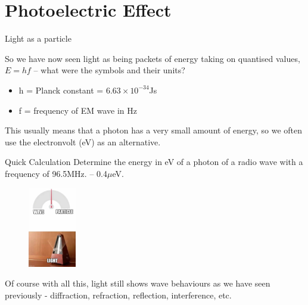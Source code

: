 \documentclass[../Main.tex]{subfiles}
\begin{document}
\author{Photoelectric Effect} %
\date{Year 1 Topic 20} %

\section{Photoelectric Effect} %

\begin{frame}{Light as a particle}
\begin{multicols}{2}
\begin{minipage}{7cm}
   So we have now seen light as being packets of energy taking on quantised values, $E=hf$ -- what were the symbols and their units?
   \pause
   \begin{itemize}
       \item h = Planck constant = $6.63\times 10 ^{-34}$Js
       \item f = frequency of EM wave in Hz
   \end{itemize}
   This usually means that a photon has a very small amount of energy, so we often use the electronvolt (eV) as an alternative.
   \end{minipage}
   \pause

   \begin{exampleblock}{Quick Calculation}
   Determine the energy in eV of a photon of a radio wave with a frequency of 96.5MHz. \pause 
   -- 0.4$\mu$eV.
   \end{exampleblock} \pause
  
   \columnbreak
   \begin{figure}
       \centering
       \includegraphics[height=3.5cm]{Quantum_Images/lightwaveparticle.jpg}
   \end{figure}
   \end{multicols}
Of course with all this, light still shows wave behaviours as we have seen previously - diffraction, refraction, reflection, interference, etc.
\end{frame}
\end{document}
